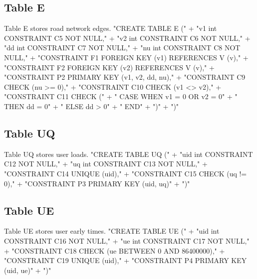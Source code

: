 \subsection{Table E}
Table E stores road network edges.
\nwenddocs{}\endmoddef{}
"CREATE TABLE E ("
  + "v1  int  CONSTRAINT C5 NOT NULL,"
  + "v2  int  CONSTRAINT C6 NOT NULL,"
  + "dd  int  CONSTRAINT C7 NOT NULL,"
  + "nu  int  CONSTRAINT C8 NOT NULL,"
  + "CONSTRAINT F1 FOREIGN KEY (v1) REFERENCES V (v),"
  + "CONSTRAINT F2 FOREIGN KEY (v2) REFERENCES V (v),"
  + "CONSTRAINT P2 PRIMARY KEY (v1, v2, dd, nu),"
  + "CONSTRAINT C9 CHECK (nu >= 0),"
  + "CONSTRAINT C10 CHECK (v1 <> v2),"
  + "CONSTRAINT C11 CHECK ("
  + "  CASE WHEN v1 = 0 OR v2 = 0"
  + "    THEN dd = 0"
  + "    ELSE dd > 0"
  + "  END"
  + ")"
  + ")"
\nwendcode{}\nwdocspar

\subsection{Table UQ}
Table UQ stores user loads.
\nwenddocs{}\endmoddef{}
"CREATE TABLE UQ ("
  + "uid int  CONSTRAINT C12 NOT NULL,"
  + "uq  int  CONSTRAINT C13 NOT NULL,"
  + "CONSTRAINT C14 UNIQUE (uid),"
  + "CONSTRAINT C15 CHECK (uq != 0),"
  + "CONSTRAINT P3 PRIMARY KEY (uid, uq)"
  + ")"
\nwendcode{}\nwdocspar

\subsection{Table UE}
Table UE stores user early times.
\nwenddocs{}\endmoddef{}
"CREATE TABLE UE ("
  + "uid int  CONSTRAINT C16 NOT NULL,"
  + "ue  int  CONSTRAINT C17 NOT NULL,"
  + "CONSTRAINT C18 CHECK (ue BETWEEN 0 AND 86400000),"
  + "CONSTRAINT C19 UNIQUE (uid),"
  + "CONSTRAINT P4 PRIMARY KEY (uid, ue)"
  + ")"
\nwendcode{}\nwdocspar

